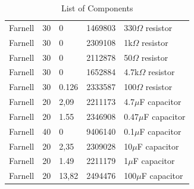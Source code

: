 \begin{table}[h]
\begin{tabular}{lllll}
        Farnell     & 30     & 0             & 1469803                & 330$\Omega$ resistor            \\
        Farnell     & 30     & 0             & 2309108                & 1k$\Omega$ resistor             \\
        Farnell     & 30     & 0             & 2112878                & 50$\Omega$ resistor             \\
        Farnell     & 30     & 0             & 1652884                & 4.7k$\Omega$ resistor           \\
        Farnell     & 30     & 0.126         & 2333587                & 100$\Omega$ resistor            \\
        Farnell     & 20     & 2,09          & 2211173                & 4.7$\mu$F capacitor             \\
        Farnell     & 20     & 1.55          & 2346908                & 0.47$\mu$F capacitor            \\
        Farnell     & 40     & 0             & 9406140                & 0.1$\mu$F capacitor             \\
        Farnell     & 20     & 2,35          & 2309028                & 10$\mu$F capacitor              \\
        Farnell     & 20     & 1.49          & 2211179                & 1$\mu$F capacitor               \\
        Farnell     & 20     & 13,82         & 2494476                & 100$\mu$F capacitor
    \end{tabular}
    \caption{List of Components}
    \label{listofcomponents}
\end{table}

